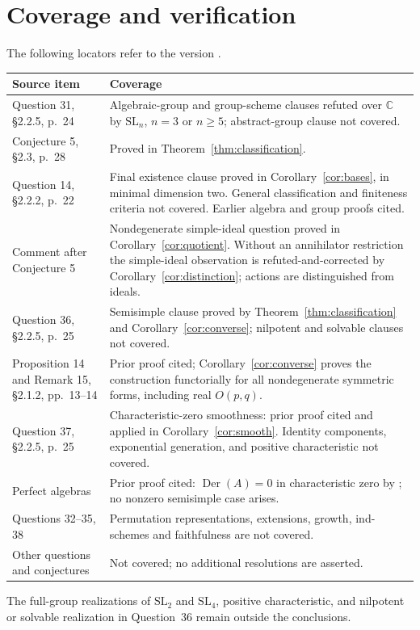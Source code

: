 \documentclass[11pt]{article}
\DeclareMathOperator{\Der}{Der}
\newcommand{\C}{\mathbb C}
\begin{document}
\section{Coverage and verification}
The following locators refer to the version \cite{survey}.
\begin{center}
\small
\begin{tabular}{@{}p{.29\linewidth}p{.64\linewidth}@{}}
\toprule
Source item & Coverage\\
\midrule
Question 31, \S2.2.5, p.~24 & Algebraic-group and group-scheme clauses refuted
over $\C$ by $\mathrm{SL}_n$, $n=3$ or $n\ge5$; abstract-group clause not covered.\\
Conjecture 5, \S2.3, p.~28 & Proved in Theorem~\ref{thm:classification}.\\
Question 14, \S2.2.2, p.~22 & Final existence clause proved in
Corollary~\ref{cor:bases}, in minimal dimension two. General classification
and finiteness criteria not covered. Earlier algebra and group proofs cited.\\
Comment after Conjecture 5 & Nondegenerate simple-ideal question proved in
Corollary~\ref{cor:quotient}. Without an annihilator restriction the
simple-ideal observation is refuted-and-corrected by
Corollary~\ref{cor:distinction}; actions are distinguished from ideals.\\
Question 36, \S2.2.5, p.~25 & Semisimple clause proved by
Theorem~\ref{thm:classification} and Corollary~\ref{cor:converse};
nilpotent and solvable clauses not covered.\\
Proposition 14 and Remark 15, \S2.1.2, pp.~13--14 & Prior proof cited;
Corollary~\ref{cor:converse} proves the construction functorially for all
nondegenerate symmetric forms, including real $O(p,q)$.\\
Question 37, \S2.2.5, p.~25 & Characteristic-zero smoothness: prior proof
cited and applied in Corollary~\ref{cor:smooth}. Identity components,
exponential generation, and positive characteristic not covered.\\
Perfect algebras & Prior proof cited: $\Der(A)=0$ in characteristic zero
by \cite[\S4]{el}; no nonzero semisimple case arises.\\
Questions 32--35, 38 & Permutation representations, extensions, growth,
ind-schemes and faithfulness are not covered.\\
Other questions and conjectures & Not covered; no additional resolutions
are asserted.\\
\bottomrule
\end{tabular}
\end{center}
The full-group realizations of $\mathrm{SL}_2$ and $\mathrm{SL}_4$,
positive characteristic, and nilpotent or solvable realization in
Question~36 remain outside the conclusions.
\end{document}
